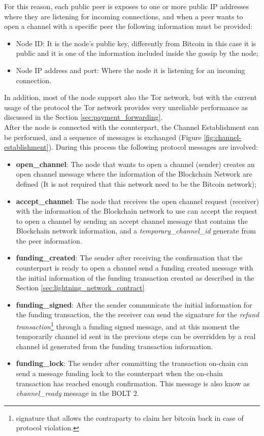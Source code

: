 For this reason, each public peer is exposes to one or more public IP addresses where
they are listening for incoming connections, and when a peer wants to open
a channel with a specific peer the following information must be provided:

\begin{itemize}
  \item Node ID: It is the node's public key, differently from Bitcoin in this case it is public and it is one of the information included inside the gossip by the node;
  \item Node IP address and port: Where the node it is listening for an incoming connection.
\end{itemize}

In addition, most of the node support also the Tor network, but with the current usage of the protocol the Tor network provides very unreliable
performance as discussed in the Section \ref{sec:payment_forwarding}.\\
After the node is connected with the counterpart, the Channel Establishment can be performed, and a sequence
of messages is exchanged (Figure \ref{fig:channel-establishment}). During this process
the following protocol messages are involved:

\begin{itemize}
  \item {\bf open\_channel}: The node that wants to open a channel (sender) creates an open channel message where the information of the
        Blockchain Network are defined (It is not required that this network need to be the Bitcoin network);
  \item {\bf accept\_channel}: The node that receives the open channel request (receiver) with the information of the Blockchain network to use
        can accept the request to open a channel by sending an accept channel message that contains the Blockchain network information, and
        a \emph{temporary\_channel\_id} generate from the peer information.
  \item {\bf funding\_created}: The sender after receiving the confirmation that the counterpart is ready to open a channel
        send a funding created message with the initial information of the funding transaction created as described in the Section \ref{sec:lightning_network_contract}
  \item {\bf funding\_signed}: After the sender communicate the initial information for the funding transaction, the
        the receiver can send the signature for the \emph{refund transaction}\footnote{signature that allows the contraparty to claim her bitcoin back in case of protocol violation.} through a funding signed message, and at this moment the temporarily
        channel id sent in the previous steps can be overridden by a real channel id generated from the funding transaction information.
  \item {\bf funding\_lock}: The sender after committing the transaction on-chain can send a message funding lock to the counterpart when
        the on-chain transaction has reached enough confirmation. This message is also know as \emph{channel\_ready} message in the BOLT 2\cite{bolt2}.
\end{itemize}

